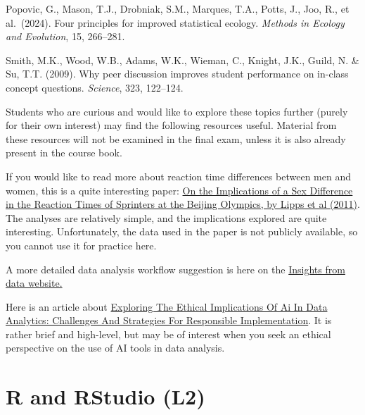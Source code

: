\documentclass[
  letterpaper,
  8pt,
  a4paper]{book}
\begin{document}
Popovic, G., Mason, T.J., Drobniak, S.M., Marques, T.A., Potts, J., Joo,
R., et al.~(2024). Four principles for improved statistical ecology.
\emph{Methods in Ecology and Evolution}, 15, 266--281.

Smith, M.K., Wood, W.B., Adams, W.K., Wieman, C., Knight, J.K., Guild,
N. \& Su, T.T. (2009). Why peer discussion improves student performance
on in-class concept questions. \emph{Science}, 323, 122--124.

Students who are curious and would like to explore these topics further
(purely for their own interest) may find the following resources useful.
Material from these resources will not be examined in the final exam,
unless it is also already present in the course book.

If you would like to read more about reaction time differences between
men and women, this is a quite interesting paper:
\href{https://journals.plos.org/plosone/article?id=10.1371/journal.pone.0026141}{On
the Implications of a Sex Difference in the Reaction Times of Sprinters
at the Beijing Olympics, by Lipps et al (2011)}. The analyses are
relatively simple, and the implications explored are quite interesting.
Unfortunately, the data used in the paper is not publicly available, so
you cannot use it for practice here.

A more detailed data analysis workflow suggestion is here on the
\href{https://insightsfromdata.io/insights-workflow.html\#insights-workflow}{Insights
from data website.}

Here is an article about
\href{https://www.ijcrt.org/papers/IJCRT2309747.pdf}{Exploring The
Ethical Implications Of Ai In Data Analytics: Challenges And Strategies
For Responsible Implementation}. It is rather brief and high-level, but
may be of interest when you seek an ethical perspective on the use of AI
tools in data analysis.


\chapter*{R and RStudio (L2)}\label{r-and-rstudio-l2}

\end{document}

